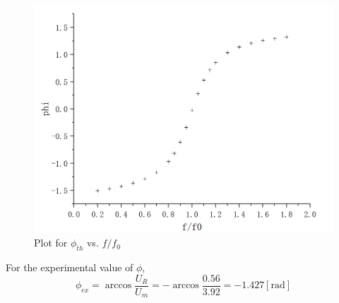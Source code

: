 \documentclass[12pt]{article}
\begin{document}
\begin{figure}[H]
\centering
\includegraphics[scale=0.25]{P12.jpg}
\caption{Plot for $\phi_{th}$ vs. $f/f_0$}
\end{figure}
For the experimental value of $\phi$,
$$\phi_{ex}=\arccos\frac{U_R}{U_m}=-\arccos\frac{0.56}{3.92}=-1.427[\mathrm{rad}]$$
\end{document}
